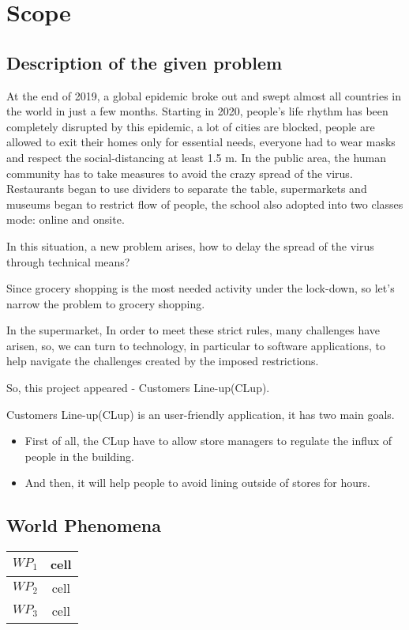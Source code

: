 \documentclass[a4paper,12pt]{book}
\begin{document}
\section{Scope}
\subsection{Description of the given problem}

At the end of 2019, a global epidemic broke out and swept almost all countries in the world in just a few months. Starting in 2020, people's life rhythm has been completely disrupted by this epidemic, a lot of cities are blocked, people are allowed to exit their homes only for essential needs, everyone had to wear masks and respect the social-distancing at least 1.5 m. In the public area, the human community has to take measures to avoid the crazy spread of the virus. Restaurants began to use dividers to separate the table, supermarkets and museums began to restrict flow of people, the school also adopted into two classes mode: online and onsite.

In this situation, a new problem arises, how to delay the spread of the virus through technical means? 

Since grocery shopping is the most needed activity under the lock-down, so let’s narrow the problem to grocery shopping.

In the supermarket, In order to meet these strict rules, many challenges have arisen, so, we can turn to technology, in particular to software applications, to help navigate the challenges created by the imposed restrictions.

So, this project appeared - Customers Line-up(CLup).


Customers Line-up(CLup) is an user-friendly application, it has two main goals. 
\begin{itemize}
	\item  First of all, the CLup have to allow store managers to regulate the influx of people in the building.
	\item  And then, it will help people to avoid lining outside of stores for hours.	
\end{itemize}

\subsection{World Phenomena}
\begin{center}
	\begin{tabular}{ c|c } 
		\hline
		$WP_1$ & cell \\ 
		\hline
		$WP_2$ & cell \\ 
		\hline
		$WP_3$ & cell \\ 
		\hline
	\end{tabular}
\end{center}
\end{document}
